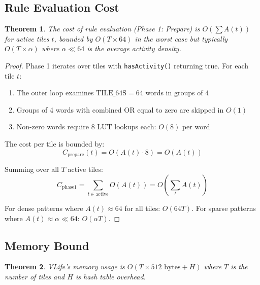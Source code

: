 \documentclass[11pt]{article}
\newtheorem{theorem}{Theorem}[section]
\theoremstyle{definition}
\begin{document}
    \subsection{Rule Evaluation Cost}

    \begin{theorem}
        The cost of rule evaluation (Phase 1: Prepare) is $O(\sum A(t))$ for active tiles $t$, bounded by $O(T \times 64)$ in the worst case but typically $O(T \times \alpha)$ where $\alpha \ll 64$ is the average activity density.
    \end{theorem}

    \begin{proof}
        Phase 1 iterates over tiles with \texttt{hasActivity()} returning true. For each tile $t$:
        \begin{enumerate}
            \item The outer loop examines $\text{TILE\_64S} = 64$ words in groups of 4
            \item Groups of 4 words with combined OR equal to zero are skipped in $O(1)$
            \item Non-zero words require 8 LUT lookups each: $O(8)$ per word
        \end{enumerate}

        The cost per tile is bounded by:
        \[C_{\text{prepare}}(t) = O(A(t) \cdot 8) = O(A(t))\]

        Summing over all $T$ active tiles:
        \[C_{\text{phase1}} = \sum_{t \in \text{active}} O(A(t)) = O\left(\sum_{t} A(t)\right)\]

        For dense patterns where $A(t) \approx 64$ for all tiles: $O(64T)$.
        For sparse patterns where $A(t) \approx \alpha \ll 64$: $O(\alpha T)$.
    \end{proof}

    \subsection{Memory Bound}

    \begin{theorem}
        VLife's memory usage is $O(T \times 512 \text{ bytes} + H)$ where $T$ is the number of tiles and $H$ is hash table overhead.
    \end{theorem}
\end{document}
